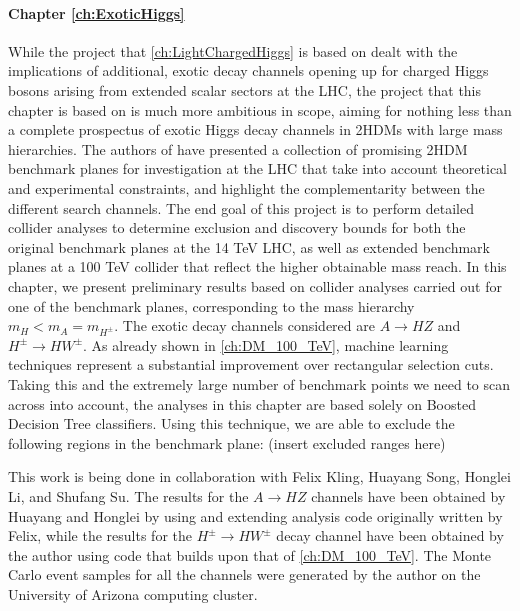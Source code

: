\paragraph{Chapter \ref{ch:ExoticHiggs}}
While the project that \autoref{ch:LightChargedHiggs} is based on dealt with the implications of additional, exotic decay channels opening up for charged Higgs bosons arising from extended scalar sectors at the LHC, the project that this chapter is based on is much more ambitious in scope, aiming for nothing less than a complete prospectus of exotic Higgs decay channels in 2HDMs with large mass hierarchies. The authors of \citep{Kling2016} have presented a collection of promising 2HDM benchmark planes for investigation at the LHC that take into account theoretical and experimental constraints, and highlight the complementarity between the different search channels. The end goal of this project is to perform detailed collider analyses to determine exclusion and discovery bounds for both the original benchmark planes at the 14 TeV LHC, as well as extended benchmark planes at a 100 TeV collider that reflect the higher obtainable mass reach. In this chapter, we present preliminary results based on collider analyses carried out for one of the benchmark planes, corresponding to the mass hierarchy $m_H < m_A = m_{H^\pm}$. The exotic decay channels considered are $A\rightarrow HZ$ and $H^\pm\rightarrow HW^\pm$. As already shown in \autoref{ch:DM_100_TeV}, machine learning techniques represent a substantial improvement over rectangular selection cuts. Taking this and the extremely large number of benchmark points we need to scan across into account, the analyses in this chapter are based solely on Boosted Decision Tree classifiers. Using this technique, we are able to exclude the following regions in the benchmark plane: (insert excluded ranges here)

This work is being done in collaboration with Felix Kling, Huayang Song, Honglei Li, and Shufang Su. The results for the $A\rightarrow HZ$ channels have been obtained by Huayang and Honglei by using and extending analysis code originally written by Felix, while the results for the $H^\pm\rightarrow HW^\pm$ decay channel have been obtained by the author using code that builds upon that of \autoref{ch:DM_100_TeV}. The Monte Carlo event samples for all the channels were generated by the author on the University of Arizona computing cluster. 

